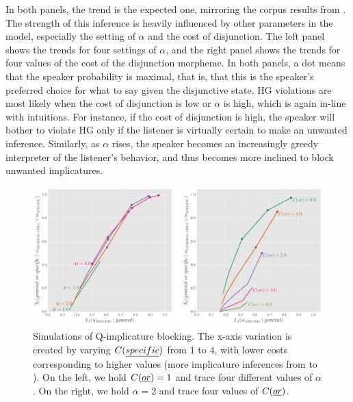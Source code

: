 \documentclass[12pt,twoside]{article}
\renewcommand{\_}{\textbf{\textunderscore\hspace{-4pt}\textunderscore\hspace{-3pt}\textunderscore\hspace{-4pt}\textunderscore}\hspace{0.5pt}}			%
\begin{document}
In both panels, the trend is the expected one, mirroring the corpus
results from . The strength of this inference is
heavily influenced by other parameters in the model, especially the
setting of $\alpha$ and the cost of disjunction. The left panel shows
the trends for four settings of $\alpha$, and the right panel shows
the trends for four values of the cost of the disjunction morpheme. In
both panels, a dot means that the speaker probability is maximal, that
is, that this is the speaker's preferred choice for what to say given
the disjunctive state. HG violations are most likely when the cost of
disjunction is low or $\alpha$ is high, which is again in-line with
intuitions. For instance, if the cost of disjunction is high, the
speaker will bother to violate HG only if the listener is virtually
certain to make an unwanted inference. Similarly, as $\alpha$ rises,
the speaker becomes an increasingly greedy interpreter of the
listener's behavior, and thus becomes more inclined to block unwanted
implicatures.

\begin{figure}[tp]
  \centering
  \includegraphics[width=1\textwidth]{fig/Q-implicature-simulation}  
  \caption{Simulations of Q-implicature blocking. The x-axis variation is created
    by varying $C(\emph{specific})$ from $1$ to $4$, with lower
    costs corresponding to higher values (more implicature inferences
    from  to ).  On the left, we hold
    $C(\emph{or}) =1$ and trace four different values of
    $\alpha$. On the right, we hold $\alpha=2$ and trace four values
    of $C(\emph{or})$.}
  \label{fig:qsims}
\end{figure}
\end{document}
